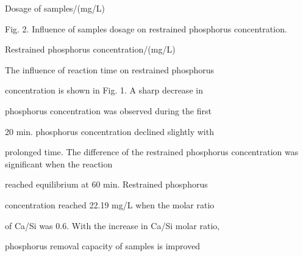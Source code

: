 \documentclass[a4paper,portrait,12pt]{article}
\begin{document}
\begin{flushleft}
Dosage of samples/(mg/L)
\end{flushleft}





\begin{flushleft}
Fig. 2. Inﬂuence of samples dosage on restrained phosphorus concentration.
\end{flushleft}





\begin{flushleft}
Restrained phosphorus concentration/(mg/L)
\end{flushleft}





\begin{flushleft}
The inﬂuence of reaction time on restrained phosphorus
\end{flushleft}


\begin{flushleft}
concentration is shown in Fig. 1. A sharp decrease in
\end{flushleft}


\begin{flushleft}
phosphorus concentration was observed during the ﬁrst
\end{flushleft}


\begin{flushleft}
20 min. phosphorus concentration declined slightly with
\end{flushleft}


\begin{flushleft}
prolonged time. The difference of the restrained phosphorus concentration was signiﬁcant when the reaction
\end{flushleft}


\begin{flushleft}
reached equilibrium at 60 min. Restrained phosphorus
\end{flushleft}


\begin{flushleft}
concentration reached 22.19 mg/L when the molar ratio
\end{flushleft}


\begin{flushleft}
of Ca/Si was 0.6. With the increase in Ca/Si molar ratio,
\end{flushleft}


\begin{flushleft}
phosphorus removal capacity of samples is improved
\end{flushleft}
\end{document}
